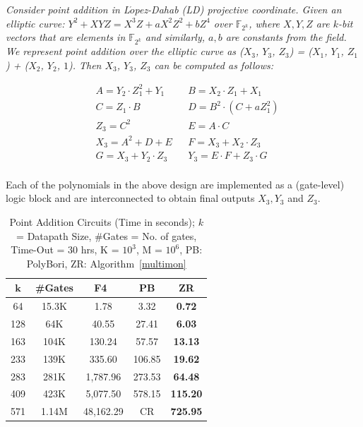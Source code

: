 \begin{Example}
{\it Consider point addition in L$\acute{o}$pez-Dahab (LD) projective coordinate. Given an elliptic curve: $Y^2 + XYZ = X^3Z + aX^2Z^2 + bZ^4$ over $\mathbb{F}_{2^k}$, where $X,Y,Z$ are $k$-bit vectors that are elements in $\mathbb{F}_{2^k}$ and similarly, $a, b$ are constants from the field. We represent point addition over the elliptic curve as ($X_3$, $Y_3$, $Z_3$) = ($X_1$, $Y_1$, $Z_1$) + ($X_2$, $Y_2$, $1$).  Then $X_3$, $Y_3$, $Z_3$ can be computed as follows:} 

\begin{align*}
&A = Y_2 \cdot Z_1^2 + Y_1  &&B = X_2 \cdot Z_1 + X_1 \\
&C = Z_1 \cdot B  &&D = B^2 \cdot(C + a Z_1^2) \\
&Z_3 = C^2 && E = A \cdot C  \\
&X_3 = A^2 + D + E &&F = X_3 + X_2 \cdot Z_3 \\
&G = X_3 + Y_2\cdot Z_3 && Y_3 = E\cdot F + Z_3 \cdot G \\
\end{align*}
\end{Example}

Each of the polynomials in the above design are implemented as a
(gate-level) logic block and are interconnected to obtain final
outputs $X_3,Y_3$ and $Z_3$. 

\begin{table}[H]
\centering
\caption{Point Addition Circuits (Time in seconds); $k$ = Datapath Size, \#Gates = No. of gates, Time-Out = 30 hrs, K = $10^3$, M = $10^6$,
PB: PolyBori, ZR: Algorithm~\ref{multimon}}
\label{pointadd}
\begin{tabular}{| c | c || c | c | c |} \hline
$\boldsymbol{k}$&\textbf{\#Gates}&\textbf{F4~\cite{pruss:tcad}}&\textbf{PB}&\textbf{ZR} \\ \hline
64&15.3K&1.78&3.32&\textbf{0.72} \\ \hline
128&64K&40.55&27.41&\textbf{6.03} \\ \hline
163&104K&130.24&57.57&\textbf{13.13} \\ \hline
233&139K&335.60&106.85&\textbf{19.62} \\ \hline
283&281K&1,787.96&273.53& \textbf{64.48}\\ \hline
409&423K&5,077.50&578.15& \textbf{115.20}\\ \hline
571&1.14M&48,162.29&CR&\textbf{725.95} \\ \hline
\end{tabular}
\end{table}

